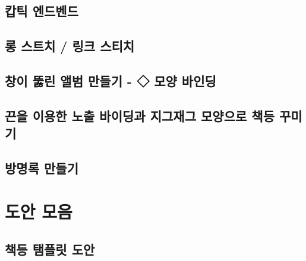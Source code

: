 \documentclass[12pt, a4paper, oneside]{book}
\begin{document}
	\section{캅틱 엔드벤드}
	\section{롱 스트치 / 링크 스티치}
	\section{창이 뚫린 앨범 만들기 - ◇ 모양 바인딩}
	\section{끈을 이용한 노출 바이딩과 지그재그 모양으로 책등 꾸미기}
	\section{방명록 만들기}




	\newpage
	\chapter{도안 모음}



	\section{책등 탬플릿 도안}




	
\end{document}
